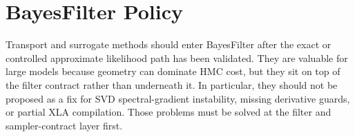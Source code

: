 \section{BayesFilter Policy}
\label{sec:bf-transport-policy}

Transport and surrogate methods should enter BayesFilter after the exact or
controlled approximate likelihood path has been validated.  They are valuable
for large models because geometry can dominate HMC cost, but they sit on top of
the filter contract rather than underneath it.  In particular, they should not
be proposed as a fix for SVD spectral-gradient instability, missing derivative
guards, or partial XLA compilation.  Those problems must be solved at the
filter and sampler-contract layer first.
